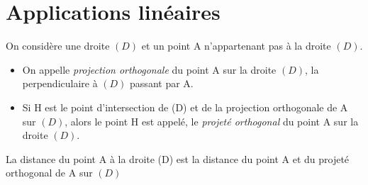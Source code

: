 \documentclass[nocrop]{sesamanuel}
\begin{document}
\section{Applications linéaires}
\begin{definition}
On considère une droite $(D)$ et un point A n'appartenant pas à la droite $(D)$.\\
\begin{itemize}
\item On appelle \emph{projection orthogonale} du point A sur la droite $(D)$, la perpendiculaire à $(D)$ passant par A.
\item Si H est le point d'intersection de (D) et de la projection orthogonale de A sur $(D)$, alors le point H est appelé, le \emph{projeté orthogonal} du point A sur la droite $(D)$.
\end{itemize}
\end{definition}

\begin{definition}
La distance du point A à la droite (D) est la distance du point A et du projeté orthogonal de A sur $(D)$
\end{definition}
\end{document}
